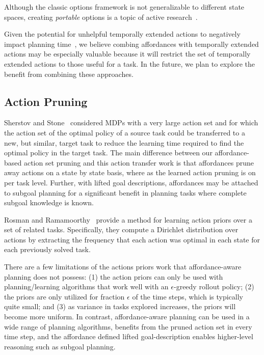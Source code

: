 \documentclass[letterpaper]{article}
\begin{document}
Although the classic options framework is not generalizable to different state spaces,
creating {\em portable} options is a topic of active research~\cite{konidaris07,konidaris2009efficient,Ravindran03analgebraic,croonenborghs2008learning,andre2002state,konidaris2012transfer}.

Given the potential for unhelpful temporally extended actions to negatively impact planning time~\cite{Jong:2008zr}, we believe combing affordances with temporally extended actions
may be especially valuable because it will restrict the set of temporally extended actions to those
useful for a task. In the future, we plan to explore the benefit from combining
these approaches.

\subsection{Action Pruning}

Sherstov and Stone~\cite{sherstov2005improving} considered MDPs with a very large action set and for which the action
set of the optimal policy of a source task could be transferred to a new, but similar, target
task to reduce the learning time required to find the optimal policy in the target task. The main difference between our affordance-based action set pruning and this action transfer
work is that affordances prune away actions on a state by state basis, where
as the learned action pruning is on per task level. Further, with lifted goal descriptions, affordances may be attached to subgoal planning for a significant
benefit in planning tasks where complete subgoal knowledge is known.

Rosman and Ramamoorthy~\cite{rosman2012good} provide a method for learning action priors over a set of related tasks. Specifically, they compute a Dirichlet distribution over actions by extracting the frequency that each action was optimal in each state for each previously solved task.

There are a few limitations of the actions priors work that affordance-aware planning does not possess: (1) the action priors can only be used with planning/learning algorithms that work well with an $\epsilon$-greedy rollout policy; (2) the priors are only utilized for fraction $\epsilon$ of the time steps, which is typically quite small; and (3) as variance in tasks explored increases, the priors will become more uniform. In contrast, affordance-aware planning can be used in a wide range of planning algorithms, benefits from the pruned action set in every time step, and the affordance defined lifted goal-description enables higher-level reasoning such as subgoal planning.
\end{document}
